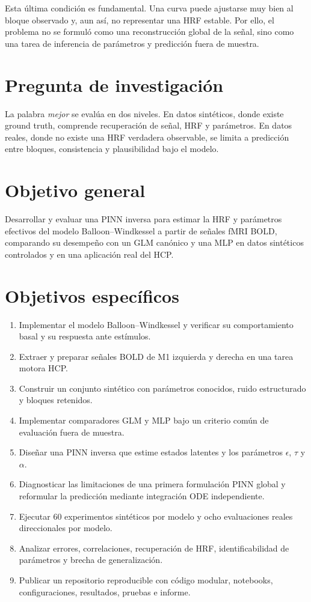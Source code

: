 Esta última condición es fundamental. Una curva puede ajustarse muy bien al bloque observado y, aun así, no representar una HRF estable. Por ello, el problema no se formuló como una reconstrucción global de la señal, sino como una tarea de inferencia de parámetros y predicción fuera de muestra.

\section{Pregunta de investigación}

La palabra \emph{mejor} se evalúa en dos niveles. En datos sintéticos, donde existe ground truth, comprende recuperación de señal, HRF y parámetros. En datos reales, donde no existe una HRF verdadera observable, se limita a predicción entre bloques, consistencia y plausibilidad bajo el modelo.

\section{Objetivo general}
Desarrollar y evaluar una PINN inversa para estimar la HRF y parámetros efectivos del modelo Balloon--Windkessel a partir de señales fMRI BOLD, comparando su desempeño con un GLM canónico y una MLP en datos sintéticos controlados y en una aplicación real del HCP.

\section{Objetivos específicos}
\begin{enumerate}
  \item Implementar el modelo Balloon--Windkessel y verificar su comportamiento basal y su respuesta ante estímulos.
  \item Extraer y preparar señales BOLD de M1 izquierda y derecha en una tarea motora HCP.
  \item Construir un conjunto sintético con parámetros conocidos, ruido estructurado y bloques retenidos.
  \item Implementar comparadores GLM y MLP bajo un criterio común de evaluación fuera de muestra.
  \item Diseñar una PINN inversa que estime estados latentes y los parámetros $\epsilon$, $\tau$ y $\alpha$.
  \item Diagnosticar las limitaciones de una primera formulación PINN global y reformular la predicción mediante integración ODE independiente.
  \item Ejecutar 60 experimentos sintéticos por modelo y ocho evaluaciones reales direccionales por modelo.
  \item Analizar errores, correlaciones, recuperación de HRF, identificabilidad de parámetros y brecha de generalización.
  \item Publicar un repositorio reproducible con código modular, notebooks, configuraciones, resultados, pruebas e informe.
\end{enumerate}

